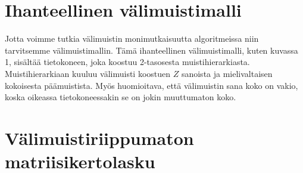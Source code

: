 \documentclass[finnish]{tktltiki2}
\theoremstyle{definition}
\theoremstyle{remark}
\begin{document}
\section{Ihanteellinen välimuistimalli}
Jotta voimme tutkia välimuistin monimutkaisuutta algoritmeissa niin tarvitsemme
välimuistimallin. Tämä ihanteellinen välimuistimalli, kuten kuvassa 1, sisältää
tietokoneen, joka koostuu 2-tasosesta muistihierarkiasta. Muistihierarkiaan
kuuluu välimuisti koostuen $ Z $ sanoista ja mielivaltaisen
kokoisesta päämuistista. Myös huomioitava, että välimuistin sana koko on
vakio, koska oikeassa tietokoneessakin se on jokin muuttumaton koko.
\section{Välimuistiriippumaton matriisikertolasku}

%
%
% 
%



\end{document}
